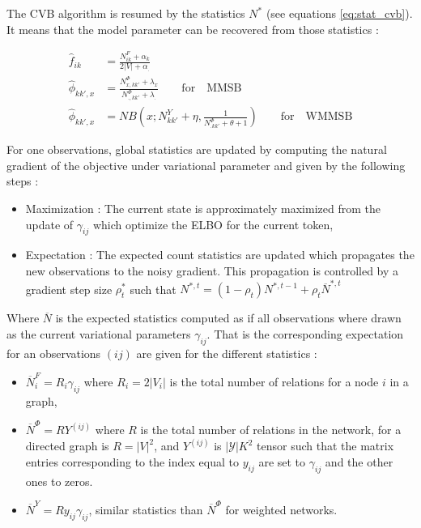 The CVB algorithm is resumed by the statistics $N^*$ (see equations \eqref{eq:stat_cvb}). It means that the model parameter can be recovered from those statistics :

\begin{align*}
    \hat f_{ik} &= \frac{N^{F}_{ik} + \alpha_k }{2|V| + \alpha_{\bm{.}}} \\
    \hat \phi_{kk',x} &= \frac{ N^{\Phi}_{x, kk'} + \lambda_x}{N^{\Phi}_{\bm{.}, kk'} + \lambda_{\bm{.}}}  \qquad \mathrm{for}\quad\mathrm{MMSB}\\
    \hat \phi_{kk',x} &= NB(x; N^Y_{kk'} + \eta, \frac{1}{N^{\Phi}_{\bm{.}kk'} + \theta + 1} ) \qquad \mathrm{for}\quad\mathrm{WMMSB}
\end{align*}

For one observations, global statistics are updated by computing the natural gradient of the objective under variational parameter and given by the following steps :
\begin{itemize}
    \item Maximization : The current state is approximately maximized from the update of $\gamma_{ij}$ which optimize the ELBO for the current token,
    \item Expectation : The expected count statistics are updated which propagates the new observations to the noisy gradient. This propagation is controlled by a gradient step size $\rho^{*}_t$ such that $N^{*, t} = (1-\rho_t)N^{*,t-1} + \rho_t \overline N^{*,t}$
\end{itemize}

Where $\overline N$ is the expected statistics computed as if all observations where drawn as the current variational parameters $\gamma_{ij}$. That is the corresponding  expectation for an observations $(ij)$  are given for the different statistics :
\begin{itemize}
    \item $\overline N^{F}_i = R_i \gamma_{ij}$ where $R_i=2|V_i|$ is the total number of relations for a node $i$ in a graph,
    \item $\overline N^{\Phi} = R Y^{(ij)}$ where $R$ is the total number of relations in the network, for a directed graph is $R=|V|^2$, and $Y^{(ij)}$ is $|\mathcal{Y}| K^2$ tensor such that the matrix entries corresponding to the index equal to $y_{ij}$ are set to $\gamma_{ij}$ and the other ones to zeros.
    \item $\overline N^Y = Ry_{ij}\gamma_{ij}$, similar statistics than  $\overline N^{\Phi}$ for weighted networks.
        
\end{itemize}

